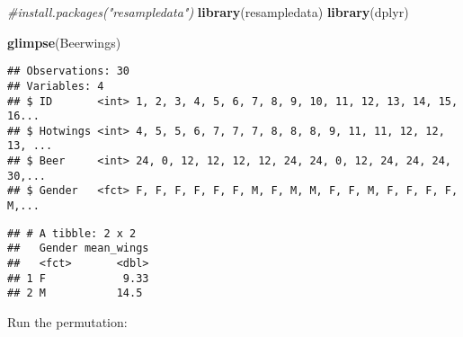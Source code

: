 \documentclass[]{article}
\newenvironment{Shaded}{\begin{snugshade}}{\end{snugshade}}
\newcommand{\KeywordTok}[1]{\textcolor[rgb]{0.13,0.29,0.53}{\textbf{#1}}}
\newcommand{\DataTypeTok}[1]{\textcolor[rgb]{0.13,0.29,0.53}{#1}}
\newcommand{\DecValTok}[1]{\textcolor[rgb]{0.00,0.00,0.81}{#1}}
\newcommand{\StringTok}[1]{\textcolor[rgb]{0.31,0.60,0.02}{#1}}
\newcommand{\CommentTok}[1]{\textcolor[rgb]{0.56,0.35,0.01}{\textit{#1}}}
\newcommand{\OtherTok}[1]{\textcolor[rgb]{0.56,0.35,0.01}{#1}}
\newcommand{\ControlFlowTok}[1]{\textcolor[rgb]{0.13,0.29,0.53}{\textbf{#1}}}
\newcommand{\OperatorTok}[1]{\textcolor[rgb]{0.81,0.36,0.00}{\textbf{#1}}}
\newcommand{\NormalTok}[1]{#1}
\begin{document}
\begin{Shaded}
\begin{Highlighting}[]
\CommentTok{#install.packages("resampledata")}
\KeywordTok{library}\NormalTok{(resampledata)}
\KeywordTok{library}\NormalTok{(dplyr)}
\end{Highlighting}
\end{Shaded}

\begin{Shaded}
\begin{Highlighting}[]
\KeywordTok{glimpse}\NormalTok{(Beerwings)}
\end{Highlighting}
\end{Shaded}

\begin{verbatim}
## Observations: 30
## Variables: 4
## $ ID       <int> 1, 2, 3, 4, 5, 6, 7, 8, 9, 10, 11, 12, 13, 14, 15, 16...
## $ Hotwings <int> 4, 5, 5, 6, 7, 7, 7, 8, 8, 8, 9, 11, 11, 12, 12, 13, ...
## $ Beer     <int> 24, 0, 12, 12, 12, 12, 24, 24, 0, 12, 24, 24, 24, 30,...
## $ Gender   <fct> F, F, F, F, F, F, M, F, M, M, F, F, M, F, F, F, F, M,...
\end{verbatim}

\begin{Shaded}
\end{Shaded}

\begin{verbatim}
## # A tibble: 2 x 2
##   Gender mean_wings
##   <fct>       <dbl>
## 1 F            9.33
## 2 M           14.5
\end{verbatim}

Run the permutation:

\begin{Shaded}
\end{Shaded}
\end{document}
